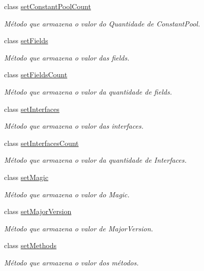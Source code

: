 \begin{DoxyCompactItemize}
class \hyperlink{classClassFile_1_1setConstantPoolCount}{set\+Constant\+Pool\+Count}
\begin{DoxyCompactList}\small\item\em Método que armazena o valor do Quantidade de Constant\+Pool. \end{DoxyCompactList}\item 
class \hyperlink{classClassFile_1_1setFields}{set\+Fields}
\begin{DoxyCompactList}\small\item\em Método que armazena o valor das fields. \end{DoxyCompactList}\item 
class \hyperlink{classClassFile_1_1setFieldsCount}{set\+Fields\+Count}
\begin{DoxyCompactList}\small\item\em Método que armazena o valor da quantidade de fields. \end{DoxyCompactList}\item 
class \hyperlink{classClassFile_1_1setInterfaces}{set\+Interfaces}
\begin{DoxyCompactList}\small\item\em Método que armazena o valor das interfaces. \end{DoxyCompactList}\item 
class \hyperlink{classClassFile_1_1setInterfacesCount}{set\+Interfaces\+Count}
\begin{DoxyCompactList}\small\item\em Método que armazena o valor da quantidade de Interfaces. \end{DoxyCompactList}\item 
class \hyperlink{classClassFile_1_1setMagic}{set\+Magic}
\begin{DoxyCompactList}\small\item\em Método que armazena o valor do Magic. \end{DoxyCompactList}\item 
class \hyperlink{classClassFile_1_1setMajorVersion}{set\+Major\+Version}
\begin{DoxyCompactList}\small\item\em Método que armazena o valor de Major\+Version. \end{DoxyCompactList}\item 
class \hyperlink{classClassFile_1_1setMethods}{set\+Methods}
\begin{DoxyCompactList}\small\item\em Método que armazena o valor dos métodos. \end{DoxyCompactList}\item 

\end{DoxyCompactItemize}
